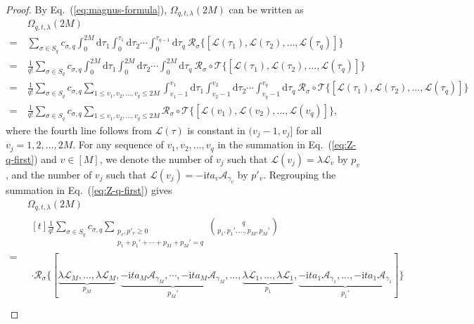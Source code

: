 \documentclass[11pt]{article}
\newcommand{\eq}[1]{(\ref{eq:#1})}
\renewcommand{\i}{\mathrm{i}}
\renewcommand{\d}{\mathrm{d}}
\newcommand{\A}{\mathcal{A}}
\newcommand{\mc}{\mathcal}
\begin{document}
\begin{proof}
    By Eq.~\eq{magnus-formula}, $\Omega_{q,t,\lambda}(2M)$ can be written as \begin{align}
        &\Omega_{q,t,\lambda}(2M) \nonumber\\
        =~&\sum_{\sigma\in S_q} c_{\sigma, q}  \int_{0}^{2M} \d \tau_1 \int_{0}^{\tau_1}\d \tau_2 \cdots \int_{0}^{\tau_{q-1}}\d \tau_q ~\mc R_{\sigma}\big\{[\mc L(\tau_1), \mc L(\tau_2), \ldots, \mc L(\tau_q)] \big\} \nonumber \\
        =~& \frac{1}{ q!}\sum_{\sigma\in S_q} c_{\sigma, q}  \int_{0}^{2M} \d \tau_1 \int_{0}^{2M}\d \tau_2 \cdots \int_{0}^{2M}\d \tau_q ~ \mc R_{\sigma} \circ \mc T\big\{[\mc L(\tau_1), \mc L(\tau_2), \ldots, \mc L(\tau_q)]\big\}  \nonumber\\
        =~&\frac{1}{ q!}\sum_{\sigma\in S_q} c_{\sigma, q} \sum_{ 1\le v_1,v_2,\ldots, v_q \le 2M} \int_{v_1-1}^{v_1} \d \tau_1 \int_{v_2-1}^{v_2}\d \tau_2 \cdots \int_{v_q-1}^{v_q}\d \tau_q ~ \mc R_{\sigma} \circ \mc T\big\{[\mc L(\tau_1), \mc L(\tau_2), \ldots, \mc L(\tau_q)] \big\}  \nonumber\\
        =~& \frac{1}{ q!}\sum_{\sigma\in S_q} c_{\sigma, q} \sum_{ 1\le v_1,v_2,\ldots, v_q \le 2M} \mc R_{\sigma} \circ \mc T\big\{[\mc L(v_1), \mc L(v_2), \ldots, \mc L(v_q)] \big\}, \label{eq:Z-q-first}
    \end{align}
    where the fourth line follows from $\mc L(\tau)$ is constant in $(v_j-1, v_j]$ for all $v_j = 1, 2, \ldots, 2M$. For any sequence of $v_1, v_2, \ldots, v_q$ in the summation in Eq.~\eq{Z-q-first} and $v\in [M]$, we denote the number of $v_j$ such that $\mc L(v_j) = \lambda \mc L_v$ by $p_v$, and the number of $v_j$ such that $\mc L(v_j) = -\i t a_v\mc A_{\gamma_v}$ by $p'_v$. Regrouping the summation in  Eq.~\eq{Z-q-first} gives \begin{align}
        &\Omega_{q,t,\lambda}(2M) \nonumber\\
        =~&\begin{multlined}[t] \frac{1}{ q!}\sum_{\sigma\in S_q} c_{\sigma, q} \sum_{\substack{p_v,p'_v\ge 0\nonumber\\ p_1+p_1'+\cdots+p_M+p_M'=q }}\binom{q}{p_1, p_1', \ldots, p_M, p_M'} \\ \cdot\mc R_{\sigma}\big\{[\underbrace{\lambda\mc L_M, \ldots, \lambda\mc L_M}_{p_M}, \underbrace{-\i ta_M\A_{\gamma_M}, \cdots, -\i ta_M\mc A_{\gamma_M}}_{p_M'},  \ldots, \underbrace{\lambda \mc L_1,  \ldots, \lambda\mc L_1}_{p_1}, \underbrace{-\i ta_1\A_{\gamma_1},  \ldots, -\i ta_1 \mc A_{\gamma_1}}_{p_1'}]\big\}\nonumber\end{multlined}\\

\end{align}
\end{proof}
\end{document}
